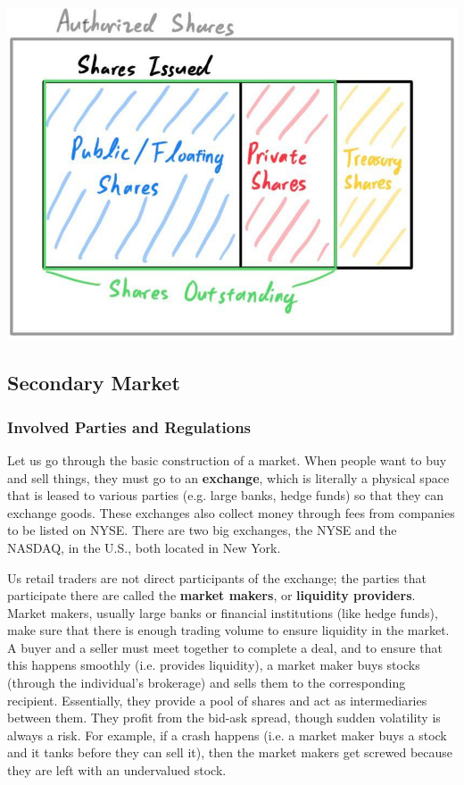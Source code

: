 \documentclass{article}
\begin{document}
\begin{center}
    \includegraphics[scale=0.25]{img/Shares_Outstanding.jpg}
\end{center}

\subsection{Secondary Market}

\subsubsection{Involved Parties and Regulations}

Let us go through the basic construction of a market. When people want to buy and sell things, they must go to an \textbf{exchange}, which is literally a physical space that is leased to various parties (e.g. large banks, hedge funds) so that they can exchange goods. These exchanges also collect money through fees from companies to be listed on NYSE. There are two big exchanges, the NYSE and the NASDAQ, in the U.S., both located in New York. 

Us retail traders are not direct participants of the exchange; the parties that participate there are called the \textbf{market makers}, or \textbf{liquidity providers}. Market makers, usually large banks or financial institutions (like hedge funds), make sure that there is enough trading volume to ensure liquidity in the market. A buyer and a seller must meet together to complete a deal, and to ensure that this happens smoothly (i.e. provides liquidity), a market maker buys stocks (through the individual's brokerage) and sells them to the corresponding recipient. Essentially, they provide a pool of shares and act as intermediaries between them. They profit from the bid-ask spread, though sudden volatility is always a risk. For example, if a crash happens (i.e. a market maker buys a stock and it tanks before they can sell it), then the market makers get screwed because they are left with an undervalued stock. 
\end{document}
